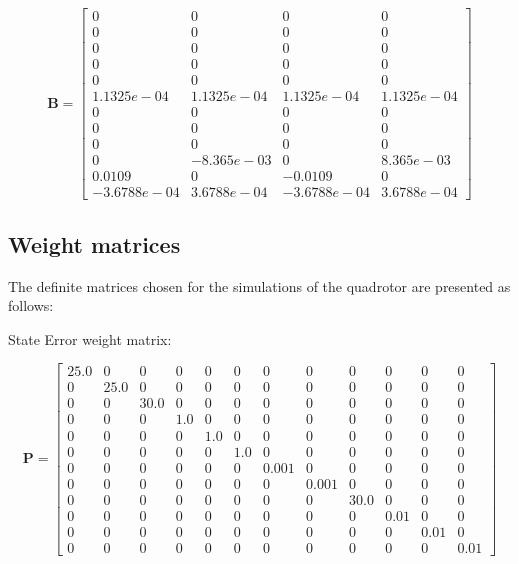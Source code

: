 \begin{equation*}
\mathbf{B} = \begin{bmatrix} 0 & 0 & 0 & 0 \\
0 & 0 & 0 & 0 \\
0 & 0 & 0 & 0 \\
0 & 0 & 0 & 0 \\
0 & 0 & 0 & 0 \\
1.1325e-04 & 1.1325e-04 & 1.1325e-04 & 1.1325e-04 \\
0 & 0 & 0 & 0 \\
0 & 0 & 0 & 0 \\
0 & 0 & 0 & 0 \\
0 & -8.365e-03 & 0 & 8.365e-03 \\
0.0109 & 0 & -0.0109 & 0 \\
-3.6788e-04 & 3.6788e-04 & -3.6788e-04 & 3.6788e-04 \end{bmatrix}
\end{equation*}

\subsection{Weight matrices	}

The definite matrices chosen for the simulations of the quadrotor are presented as follows:

State Error weight matrix:

\begin{equation*}
\mathbf{P} = \begin{bmatrix} 25.0 & 0 & 0 & 0 & 0 & 0 & 0 & 0 & 0 & 0 & 0 & 0 \\
0 & 25.0 & 0 & 0 & 0 & 0 & 0 & 0 & 0 & 0 & 0 & 0 \\
0 & 0 & 30.0 & 0 & 0 & 0 & 0 & 0 & 0 & 0 & 0 & 0 \\
0 & 0 & 0 & 1.0 & 0 & 0 & 0 & 0 & 0 & 0 & 0 & 0 \\
0 & 0 & 0 & 0 & 1.0 & 0 & 0 & 0 & 0 & 0 & 0 & 0 \\
0 & 0 & 0 & 0 & 0 & 1.0 & 0 & 0 & 0 & 0 & 0 & 0 \\
0 & 0 & 0 & 0 & 0 & 0 & 0.001 & 0 & 0 & 0 & 0 & 0 \\
0 & 0 & 0 & 0 & 0 & 0 & 0 & 0.001 & 0 & 0 & 0 & 0 \\
0 & 0 & 0 & 0 & 0 & 0 & 0 & 0 & 30.0 & 0 & 0 & 0 \\
0 & 0 & 0 & 0 & 0 & 0 & 0 & 0 & 0 & 0.01 & 0 & 0 \\
0 & 0 & 0 & 0 & 0 & 0 & 0 & 0 & 0 & 0 & 0.01 & 0 \\
0 & 0 & 0 & 0 & 0 & 0 & 0 & 0 & 0 & 0 & 0 & 0.01 \end{bmatrix}
\end{equation*}


